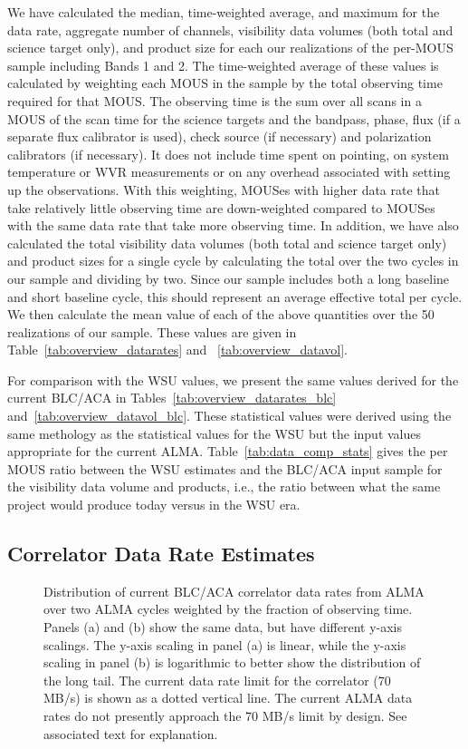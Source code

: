 \documentclass[preprint]{aastex631}
\begin{document}
We have calculated the median, time-weighted average, and maximum for the data rate, aggregate number of channels, visibility data volumes (both total and science target only), and product size for each our realizations of the per-MOUS sample including Bands 1 and 2. The time-weighted average of these values is calculated by weighting each MOUS in the sample by the  total observing time required for that MOUS. The observing time is the sum over all scans in a MOUS of the scan time for the science targets and the bandpass, phase, flux (if a separate flux calibrator is used), check source (if necessary) and polarization calibrators (if necessary). It does not include time spent on pointing, on system temperature or WVR measurements or on any overhead associated with setting up the observations. With this weighting, MOUSes with higher data rate that take relatively little observing time are down-weighted compared to MOUSes with the same data rate that take more observing time. In addition, we have also calculated the total visibility data volumes (both total and science target only) and product sizes for a single cycle by calculating the total over the two cycles  in our sample and dividing by two. Since our sample includes both a long baseline and short baseline cycle, this should represent an average effective total per cycle. We then calculate the mean value of each of the above quantities over the 50 realizations of our sample. These values are given in Table~\ref{tab:overview_datarates} and ~\ref{tab:overview_datavol}.


For comparison with the WSU values, we present the same values derived for the current BLC/ACA in Tables~\ref{tab:overview_datarates_blc} and~\ref{tab:overview_datavol_blc}. These statistical values were derived using the same methology as the statistical values for the WSU but the input values appropriate for the current ALMA. Table~\ref{tab:data_comp_stats} gives the per MOUS ratio between the WSU estimates and the BLC/ACA input sample for the visibility data volume and products, i.e., the ratio between what the same project would produce today versus in the WSU era.


\subsection{Correlator Data Rate Estimates} \label{sec:results_datarates}

\begin{figure}
    \centering
    \caption{Distribution of current BLC/ACA correlator data rates from ALMA over two ALMA cycles weighted by the fraction of observing time. Panels (a) and (b) show the same data, but have different y-axis scalings. The y-axis scaling in panel (a) is linear, while the y-axis scaling in panel (b) is logarithmic to better show the distribution of the long tail. The current data rate limit for the correlator (70 MB/s) is shown as a dotted vertical line. The current ALMA data rates do not presently approach the 70 MB/s limit by design. See associated text for explanation.}
    \label{fig:datarate_blc}
\end{figure}
\end{document}
